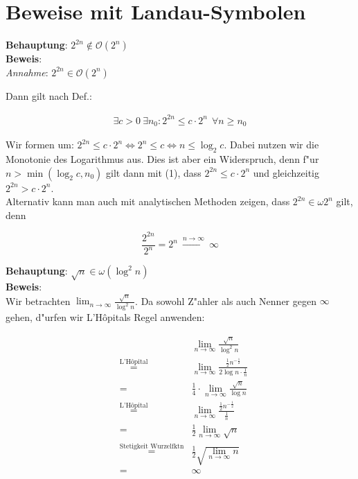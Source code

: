 \documentclass{scrartcl}
\newcommand{\bigO}{\ensuremath{\mathcal{O}}}
\begin{document}
\section{Beweise mit Landau-Symbolen}

\textbf{Behauptung}: $2^{2n} \not \in \bigO(2^n)$ \\
\textbf{Beweis}:   \\

\emph{Annahme}: $2^{2n} \in \bigO(2^n)$

Dann gilt nach Def.:

\begin{align}
\exists c > 0 \ \exists n_0: 2^{2n} \leq c\cdot 2^n \ \ \forall n \geq n_0
\end{align}

Wir formen um: $2^{2n} \leq c\cdot 2^n \iff 2^n \leq c \iff n \leq \log_2 c$. Dabei nutzen wir
die Monotonie des Logarithmus aus. Dies ist aber ein Widerspruch, denn f"ur $n > \min(\log_2 c, n_0)$ gilt
dann mit (1), dass $2^{2n} \leq c\cdot 2^n$ und gleichzeitig $2^{2n} > c\cdot 2^n$.
\\

Alternativ kann man auch mit analytischen Methoden zeigen, dass $2^{2n} \in \omega{2^n}$ gilt, denn

\[ \frac{2^{2n}}{2^n} = 2^n \ \xrightarrow{n \rightarrow \infty} \ \infty \]

\noindent\textbf{Behauptung}: $\sqrt{n} \in \omega(\log^2 n)$ \\
\textbf{Beweis}:   \\

Wir betrachten $\lim_{n \rightarrow \infty} \frac{\sqrt{n}}{\log^2 n}$. Da sowohl Z"ahler als auch
Nenner gegen $\infty$ gehen, d"urfen wir L'H\^{o}pitals Regel anwenden:

\begin{align*}
  &&\lim_{n \rightarrow \infty} \frac{\sqrt{n}}{\log^2 n} \\
  &\overset{\text{L'H\^{o}pital}}{=} &\lim_{n \rightarrow \infty} \frac{\frac{1}{2}n^{-\frac{1}{2}}}{2\log n \cdot \frac{1}{n}} \\
  &= &\frac{1}{4} \cdot \lim_{n \rightarrow \infty} \frac{\sqrt{n}}{\log n} \\
  &\overset{\text{L'H\^{o}pital}}{=} &\lim_{n \rightarrow \infty} \frac{\frac{1}{2}n^{-\frac{1}{2}}}{\frac{1}{n}} \\
  &= &\frac{1}{2}\lim_{n \rightarrow \infty} \sqrt{n} \\
  &\overset{\text{Stetigkeit Wurzelfktn}}{=} &\frac{1}{2}\sqrt{\lim_{n \rightarrow \infty} n} \\
  &=&\infty
\end{align*}
\end{document}
